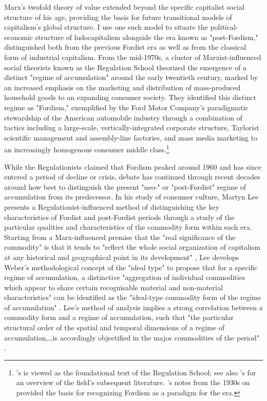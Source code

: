 Marx's twofold theory of value extended beyond the specific capitalist social structure of his age, providing the basis for future transitional models of capitalism's global structure. I use one such model to situate the political-economic structure of ludocapitalism alongside the era known as "post-Fordism," distinguished both from the previous Fordist era as well as from the classical form of industrial capitalism. From the mid-1970s, a cluster of Marxist-influenced social theorists known as the Regulation School theorized the emergence of a distinct "regime of accumulation" around the early twentieth century, marked by an increased emphasis on the marketing and distribution of mass-produced household goods to an expanding consumer society. They identified this distinct regime as "Fordism," exemplified by the Ford Motor Company's paradigmatic stewardship of the American automobile industry through a combination of tactics including a large-scale, vertically-integrated corporate structure, Taylorist scientific management and assembly-line factories, and mass media marketing to an increasingly homogenous consumer middle class.\footnote{
  \citeauthor{Aglietta1980}'s  is viewed as the foundational text of the Regulation School; see also \citeauthor{Boyer1990}'s  for an overview of the field's subsequent literature. \citeauthor{Gramsci1930}'s notes from the 1930s on  provided the basis for recognizing Fordism as a paradigm for the era.
}

While the Regulationists claimed that Fordism peaked around 1960 and has since entered a period of decline or crisis, debate has continued through recent decades around how best to distinguish the present "neo-" or "post-Fordist" regime of accumulation from its predecessor. In his study of consumer culture, Martyn Lee presents a Regulationist-influenced method of distinguishing the key characteristics of Fordist and post-Fordist periods through a study of the particular qualities and characteristics of the commodity form within each era. Starting from a Marx-influenced premise that the "real significance of the commodity" is that it tends to "reflect the whole social organization of capitalism at any historical and geographical point in its development" \autocite*[112]{Lee2003}, Lee develops Weber's methodological concept of the "ideal type" to propose that for a specific regime of accumulation, a distinctive "aggregation of individual commodities which appear to share certain recognisable material and non-material characteristics" can be identified as the "ideal-type commodity form of the regime of accumulation" \autocite[119]{Lee2003}. Lee's method of analysis implies a strong correlation between a commodity form and a regime of accumulation, such that "the particular structural order of the spatial and temporal dimensions of a regime of accumulation,…is accordingly objectified in the major commodities of the period" \autocite[124]{Lee2003}.

